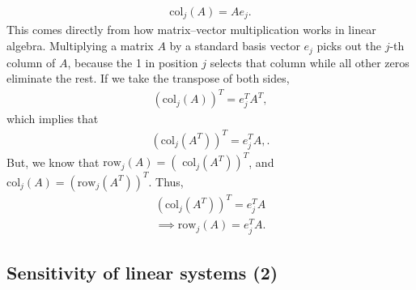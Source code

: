 \documentclass{report}
\begin{document}
\begin{itemize}
            \begin{align*}
                \text{col}_{j}(A) = Ae_{j}
            .\end{align*}
            This comes directly from how matrix–vector multiplication works in linear algebra.
            Multiplying a matrix $A$ by a standard basis vector $e_{j} $ picks out the $j$-th column of $A$, because the 1 in position $j$ selects that column while all other zeros eliminate the rest.
            \bigbreak \noindent 
            If we take the transpose of both sides,
            \begin{align*}
                \left(\text{col}_{j}(A)\right)^{T} = e_{j}^{T}A^{T},
            \end{align*}
            which implies that
            \begin{align*}
                \left(\text{col}_{j}(A^{T})\right)^{T} = e_{j}^{T}A,
            .\end{align*}
            But, we know that $\text{row}_{j}(A) = (\text{ col}_{j}(A^{T}))^{T} $, and $\text{col}_{j}(A) = (\text{row}_{j}(A^{T}))^{T} $. Thus,
            \begin{align*}
                \left(\text{col}_{j}(A^{T})\right)^{T} = e_{j}^{T}A \\
                \implies \text{row}_{j}(A) = e_{j}^{T}A
            .\end{align*}
            
            

                

    \end{itemize}

    \pagebreak 
    \subsection{Sensitivity of linear systems (2)}
    \bigbreak \noindent 
\end{document}
